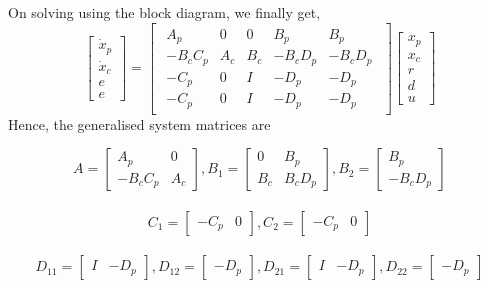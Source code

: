 \documentclass[a4paper,12pt]{article}
\begin{document}
				On solving using the block diagram, we finally get,
				\[
				\begin{bmatrix}
				\dot{x}_{p} \\
				\dot{x}_{c} \\
				\hline
				e \\
				\hline
				e
				\end{bmatrix}
				=
				\begin{bmatrix}
				\begin{array}{cc|cc|c}
				A_{p} & 0 & 0 & B_{p} & B_{p}\\
				-B_{c}C_{p} & A_{c} & B_{c} & -B_{c}D_{p} & -B_{c}D_{p}\\
				\hline
				-C_{p} & 0 & I & -D_{p} & -D_{p} \\
				\hline
				-C_{p} & 0 & I & -D_{p} & -D_{p} 
				\end{array}
				\end{bmatrix}
				\begin{bmatrix}
				x_{p} \\ x_{c} \\ \hline r \\ d \\ \hline u 
				\end{bmatrix}	
				\]
				Hence, the generalised system matrices are
				
				\[
				A =
				\begin{bmatrix}
				A_{p} & 0 \\ -B_{c}C_{p} & A_{c}	
				\end{bmatrix}
				,B_{1}=
				\begin{bmatrix}
				0 & B_{p} \\ B_{c} & B_{c}D_{p} 
				\end{bmatrix}	
				,B_{2}=
				\begin{bmatrix}
				B_{p} \\ -B_{c}D_{p} 
				\end{bmatrix}	
				\]
				\\
				\[
				C_{1}=
				\begin{bmatrix}
				-C_{p} & 0
				\end{bmatrix}	
				,C_{2}=
				\begin{bmatrix}
				-C_{p} & 0
				\end{bmatrix}	
				\]	
				\\
				\[
				D_{11}=
				\begin{bmatrix}
				I & -D_{p}
				\end{bmatrix}					
				,D_{12}=
				\begin{bmatrix}
				-D_{p}
				\end{bmatrix}	
				,D_{21}=
				\begin{bmatrix}
				I & -D_{p}
				\end{bmatrix}	
				,D_{22}=
				\begin{bmatrix}
				-D_{p}
				\end{bmatrix}	
				\]
										
\end{document}
